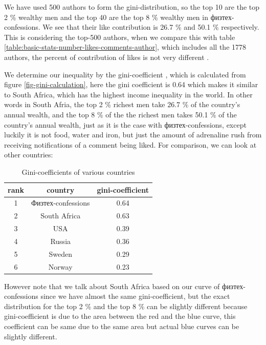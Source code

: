 \documentclass[
	11pt
] {article}
\begin{document}
	We have used 500 authors to form the gini-distribution, so the top 10 are the top \num{2} \% wealthy men and the top 40 are the top \num{8} \% wealthy men in физтех-confessions. We see that their like contribution is \num{26.7} \% and \num{50.1} \% respectively. This is considering the top-500 authors, when we compare this with table \ref{table:basic-stats-number-likes-comments-author}, which includes all the \num{1778} authors, the percent of contribution of likes is not very different \cite{sheet-calc-gini-coefficient}.

	We determine our inequality by the gini-coefficient \cite{wikipedia-gini}, which is calculated from figure \ref{fig-gini-calculation}, here the gini coefficient is \num{0.64} which makes it similar to South Africa, which has the highest income inequality in the world. In other words in South Afria, the top \num{2} \% richest men take \num{26.7} \% of the country's annual wealth, and the top \num{8} \% of the the richest men takes \num{50.1} \% of the country's annual wealth, just as it is the case with физтех-confessions, except luckily it is not food, water and iron, but just the amount of adrenaline rush from receiving notifications of a comment being liked. For comparison, we can look at other countries:
	\begin{table}[H]
		\centering
		\caption{Gini-coefficients of various countries}
		\label{table:gini-countries}
		\begin{tabular}{| c | c | c |} %
			\hline
			rank & country & gini-coefficient \\
			\hline
			1 & Физтех-confessions & \num{0.64} \\
			2 & South Africa & \num{0.63} \\
			3 & USA & \num{0.39} \\
			4 & Russia & \num{0.36} \\
			5 & Sweden & \num{0.29} \\
			6 & Norway & \num{0.23} \\
			\hline
		\end{tabular}
	\end{table}

	However note that we talk about South Africa based on our curve of физтех-confessions since we have almost the same gini-coefficient, but the exact distribution for the top \num{2} \% and the top \num{8} \% can be slightly different because gini-coefficient is due to the area between the red and the blue curve, this coefficient can be same due to the same area but actual blue curves can be slightly different.
\end{document}
